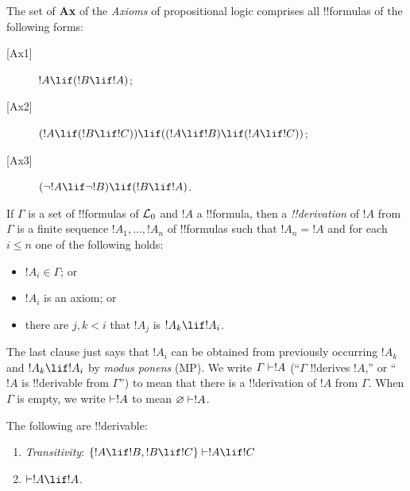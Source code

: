 \documentclass[../../include/open-logic-section]{subfiles}
\begin{document}


\begin{defn}[Axioms]
  The set of \textbf{Ax} of the \emph{Axioms} of propositional logic
  comprises all !!{formula}s of the following forms:
  \begin{description}
  \item[{[Ax1]}] $!A \lif (!B \lif !A)$;
  \item[{[Ax2]}] $(!A \lif (!B \lif !C)) \lif
    ((!A \lif !B) \lif (!A \lif !C))$;
  \item[{[Ax3]}] $(\lnot !A \lif \lnot !B) \lif (!B
    \lif !A)$.
  \end{description}
\end{defn}

\begin{defn}[!!^{derivability}]
  If $\Gamma$ is a set of !!{formula}s of $\mathcal L_0$ and $!A$ a
!!{formula}, then a \emph{!!{derivation}} of $!A$ from $\Gamma$ is a finite
sequence $!A_1,\ldots, !A_n$ of !!{formula}s such that
  $!A_n = !A$ and for each $i\le n$ one of the following
  holds:
  \begin{itemize}
  \item $!A_i \in \Gamma$; or
  \item $!A_i$ is an axiom; or
  \item there are $j,k<i$ that $!A_j$ is $!A_k \lif
    !A_i$.
  \end{itemize}
\end{defn}

\begin{explain}
The last clause just says that $!A_i$ can be obtained from
previously occurring $!A_k$ and $!A_k \lif !A_i$ by
\emph{modus ponens} (MP).  We write $\Gamma \Proves !A$
(``$\Gamma$ !!{derive}s $!A$,'' or ``$!A$ is !!{derivable} from
$\Gamma$'') to mean that there is a !!{derivation} of $!A$ from
$\Gamma$. When $\Gamma$ is empty, we write $\Proves !A$ to mean
$\varnothing \Proves !A$.
\end{explain}

\begin{prop}
 The following are !!{derivable}:
  \begin{enumerate}
  \item \emph{Transitivity}: $\{!A\lif !B, !B\lif !C\} \Proves
    !A\lif!C$
  \item $\Proves !A \lif !A$. 
  \end{enumerate}
\end{prop}
\end{document}
